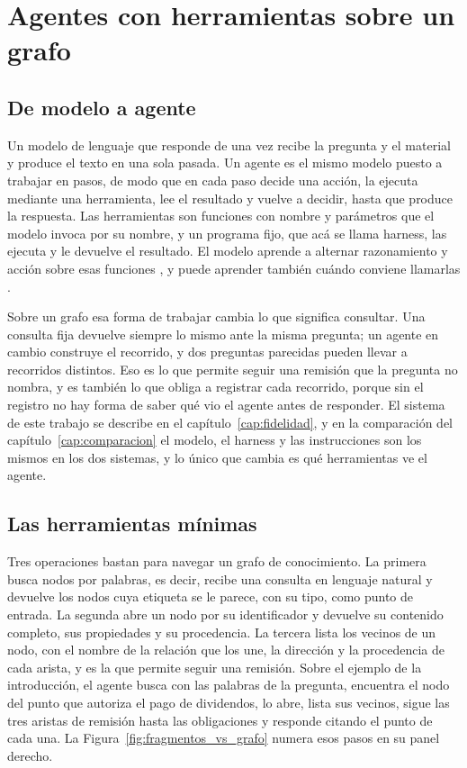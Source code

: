 \documentclass[12pt,a4paper]{report}
\begin{document}
\section{Agentes con herramientas sobre un grafo}
\label{sec:mt_agente}

\subsection{De modelo a agente}

Un modelo de lenguaje que responde de una vez recibe la pregunta y el material y produce el texto en una sola pasada. Un agente es el mismo modelo puesto a trabajar en pasos, de modo que en cada paso decide una acción, la ejecuta mediante una herramienta, lee el resultado y vuelve a decidir, hasta que produce la respuesta. Las herramientas son funciones con nombre y parámetros que el modelo invoca por su nombre, y un programa fijo, que acá se llama harness, las ejecuta y le devuelve el resultado. El modelo aprende a alternar razonamiento y acción sobre esas funciones \cite{yao2023react}, y puede aprender también cuándo conviene llamarlas \cite{schick2023toolformer}.

Sobre un grafo esa forma de trabajar cambia lo que significa consultar. Una consulta fija devuelve siempre lo mismo ante la misma pregunta; un agente en cambio construye el recorrido, y dos preguntas parecidas pueden llevar a recorridos distintos. Eso es lo que permite seguir una remisión que la pregunta no nombra, y es también lo que obliga a registrar cada recorrido, porque sin el registro no hay forma de saber qué vio el agente antes de responder. El sistema de este trabajo se describe en el capítulo~\ref{cap:fidelidad}, y en la comparación del capítulo~\ref{cap:comparacion} el modelo, el harness y las instrucciones son los mismos en los dos sistemas, y lo único que cambia es qué herramientas ve el agente.

\subsection{Las herramientas mínimas}

Tres operaciones bastan para navegar un grafo de conocimiento. La primera busca nodos por palabras, es decir, recibe una consulta en lenguaje natural y devuelve los nodos cuya etiqueta se le parece, con su tipo, como punto de entrada. La segunda abre un nodo por su identificador y devuelve su contenido completo, sus propiedades y su procedencia. La tercera lista los vecinos de un nodo, con el nombre de la relación que los une, la dirección y la procedencia de cada arista, y es la que permite seguir una remisión. Sobre el ejemplo de la introducción, el agente busca con las palabras de la pregunta, encuentra el nodo del punto que autoriza el pago de dividendos, lo abre, lista sus vecinos, sigue las tres aristas de remisión hasta las obligaciones y responde citando el punto de cada una. La Figura~\ref{fig:fragmentos_vs_grafo} numera esos pasos en su panel derecho.
\end{document}
